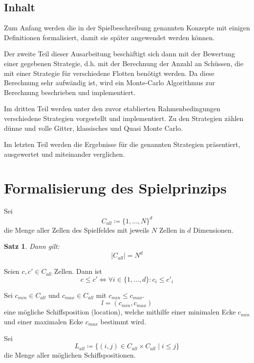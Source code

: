 \documentclass[a4paper,12pt]{llncs}
\numberwithin{equation}{section}
\newtheorem{satz}{Satz}
\begin{document}
\subsection{Inhalt}

Zum Anfang werden die in der Spielbeschreibung genannten Konzepte mit einigen Definitionen formalisiert, damit sie später angewendet werden können.

Der zweite Teil dieser Ausarbeitung beschäftigt sich dann mit der Bewertung einer gegebenen Strategie, d.h. mit der Berechnung der Anzahl an Schüssen, die mit einer Strategie für verschiedene Flotten benötigt werden.
Da diese Berechnung sehr aufwändig ist, wird ein Monte-Carlo Algorithmus zur Berechnung beschrieben und implementiert.

Im dritten Teil werden unter den zuvor etablierten Rahmenbedingungen verschiedene Strategien vorgestellt und implementiert. Zu den Strategien zählen dünne und volle Gitter, klassisches und Quasi Monte Carlo.

Im letzten Teil werden die Ergebnisse für die genannten Strategien präsentiert, ausgewertet und miteinander verglichen.

\section{Formalisierung des Spielprinzips}

\begin{definition}
Sei
\[
C_{all} \coloneqq \{1, \dots, N\}^d
\]
die Menge aller Zellen des Spielfeldes mit jeweils $N$ Zellen in $d$ Dimensionen.
\end{definition}

\begin{satz}
Dann gilt:
\[
|C_{all}|=N^d
\]
\end{satz}

\begin{definition}
Seien $c, c' \in C_{all}$ Zellen.
Dann ist
\[
c \leq c' \Leftrightarrow \forall i \in \{1, \dots, d\} \colon c_{i} \leq c'_{i} 
\]
\end{definition}

\begin{definition}
Sei $c_{min} \in C_{all}$ und $c_{max} \in C_{all}$ mit $c_{min} \leq c_{max}$.
\[
l=(c_{min}, c_{max})
\]
eine mögliche Schiffsposition (location), welche mithilfe einer minimalen Ecke $c_{min}$ und einer maximalen Ecke $c_{max}$ bestimmt wird.
\end{definition}

\begin{definition}
Sei 
\[
L_{all} \coloneqq
\{
(i, j) \in C_{all} \times C_{all}
\mid
i \leq j
\}
\] die Menge aller möglichen Schiffspositionen.
\end{definition}
\end{document}
